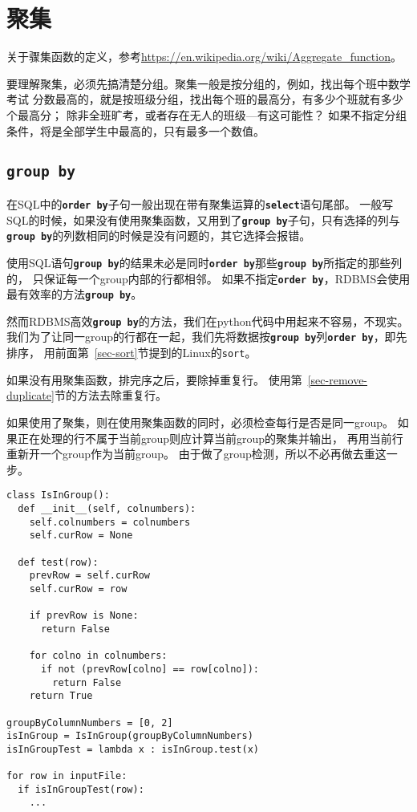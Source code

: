 \documentclass[11pt]{article}
\newcommand{\id}[1]{\texttt{#1}}
\newcommand{\kw}[1]{\texttt{\textbf{#1}}}
\begin{document}
\section{聚集}
关于骤集函数的定义，参考\href{https://en.wikipedia.org/wiki/Aggregate\_function}{https://en.wikipedia.org/wiki/Aggregate\_function}。

要理解聚集，必须先搞清楚分组。聚集一般是按分组的，例如，找出每个班中数学考试
分数最高的，就是按班级分组，找出每个班的最高分，有多少个班就有多少个最高分；
除非全班旷考，或者存在无人的班级---有这可能性？
如果不指定分组条件，将是全部学生中最高的，只有最多一个数值。

\subsection{\kw{group by}}
在SQL中的\kw{order by}子句一般出现在带有聚集运算的\kw{select}语句尾部。
一般写SQL的时候，如果没有使用聚集函数，又用到了\kw{group by}子句，只有选择的列与
\kw{group by}的列数相同的时候是没有问题的，其它选择会报错。

使用SQL语句\kw{group by}的结果未必是同时\kw{order by}那些\kw{group by}所指定的那些列的，
只保证每一个group内部的行都相邻。
如果不指定\kw{order by}，RDBMS会使用最有效率的方法\kw{group by}。

然而RDBMS高效\kw{group by}的方法，我们在python代码中用起来不容易，不现实。
我们为了让同一group的行都在一起，我们先将数据按\kw{group by}列\kw{order by}，即先排序，
用前面第~\ref{sec-sort}节提到的Linux的\id{sort}。

如果没有用聚集函数，排完序之后，要除掉重复行。
使用第~\ref{sec-remove-duplicate}节的方法去除重复行。

如果使用了聚集，则在使用聚集函数的同时，必须检查每行是否是同一group。
如果正在处理的行不属于当前group则应计算当前group的聚集并输出，
再用当前行重新开一个group作为当前group。
由于做了group检测，所以不必再做去重这一步。
\begin{lstlisting}
class IsInGroup():
  def __init__(self, colnumbers):
    self.colnumbers = colnumbers
    self.curRow = None  

  def test(row):
    prevRow = self.curRow
    self.curRow = row

    if prevRow is None:
      return False
      
    for colno in colnumbers:
      if not (prevRow[colno] == row[colno]):
        return False
    return True

groupByColumnNumbers = [0, 2]
isInGroup = IsInGroup(groupByColumnNumbers)
isInGroupTest = lambda x : isInGroup.test(x)    

for row in inputFile:
  if isInGroupTest(row):
    ...
\end{lstlisting}
\end{document}
